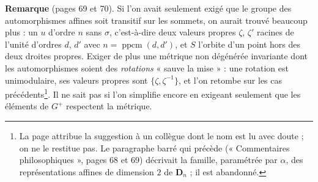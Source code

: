 \documentclass[11pt,a4paper]{article}
\begin{document}
\textbf{Remarque} (pages 69 et 70). Si l'on avait seulement exigé que le
groupe des automorphismes affines soit transitif sur les sommets, on aurait
trouvé beaucoup plus : un $u$ d'ordre $n$ sans $\sigma$, c'est-à-dire deux
valeurs propres $\zeta$, $\zeta'$ racines de l'unité d'ordres $d$, $d'$ avec
$n = \operatorname{ppcm}(d, d')$, et $S$ l'orbite d'un point hors des deux
droites propres. Exiger de plus une métrique non dégénérée invariante dont
les automorphismes soient des \emph{rotations} « sauve la mise » : une
rotation est unimodulaire, ses valeurs propres sont $\{\zeta, \zeta^{-1}\}$,
et l'on retombe sur les cas précédents\footnote{La page attribue la
suggestion à un collègue dont le nom est lu avec doute ; on ne le restitue
pas. Le paragraphe barré qui précède (« Commentaires philosophiques », pages
68 et 69) décrivait la famille, paramétrée par $\alpha$, des représentations
affines de dimension $2$ de $\mathbf{D}_n$ ; il est abandonné.}. Il ne sait pas
si l'on simplifie encore en exigeant seulement que les éléments de $G^{+}$
respectent la métrique.
\end{document}
